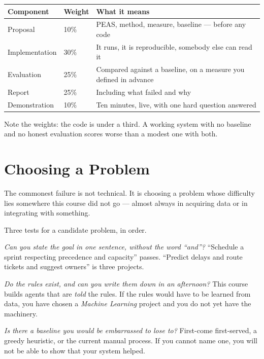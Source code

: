 \begin{examplebox}
\begin{tabular}{@{}L{4.2cm}L{1.8cm}L{7.8cm}@{}}
\toprule
\textbf{Component} & \textbf{Weight} & \textbf{What it means} \\
\midrule
Proposal & 10\% & PEAS, method, measure, baseline --- before any code \\
Implementation & 30\% & It runs, it is reproducible, somebody else can read it \\
Evaluation & 25\% & Compared against a baseline, on a measure you defined in
advance \\
Report & 25\% & Including what failed and why \\
Demonstration & 10\% & Ten minutes, live, with one hard question answered \\
\bottomrule
\end{tabular}

\smallskip
Note the weights: the code is under a third. A working system with no baseline and
no honest evaluation scores worse than a modest one with both.
\end{examplebox}

\section{Choosing a Problem}

The commonest failure is not technical. It is choosing a problem whose difficulty
lies somewhere this course did not go --- almost always in acquiring data or in
integrating with something.

\begin{conceptbox}
Three tests for a candidate problem, in order.

\emph{Can you state the goal in one sentence, without the word ``and''?} ``Schedule
a sprint respecting precedence and capacity'' passes. ``Predict delays and route
tickets and suggest owners'' is three projects.

\emph{Do the rules exist, and can you write them down in an afternoon?} This course
builds agents that are \emph{told} the rules. If the rules would have to be learned
from data, you have chosen a \emph{Machine Learning} project and you do not yet have
the machinery.

\emph{Is there a baseline you would be embarrassed to lose to?} First-come
first-served, a greedy heuristic, or the current manual process. If you cannot name
one, you will not be able to show that your system helped.
\end{conceptbox}

